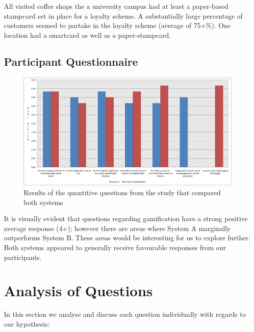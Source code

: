 All visited coffee shops the a university campus had at least a paper-based stampcard set in place for a loyalty scheme.  A substantially large percentage of customers seemed to partake in the loyalty scheme (average of 75+\%). One location had a smartcard as well as a paper-stampcard.


\subsection{Participant Questionnaire}
\begin{figure}[H]
 \centering
  \includegraphics[width=1\textwidth]{img/graph.png}
     \caption{Results of the quantitive questions from the study that compared both systems}
	 \label{participantGraph}
\end{figure}

It is visually evident that questions regarding gamification have a strong positive average response (4+); however there are areas where System A marginally outperforms System B. These areas would be interesting for us to explore further. Both systems appeared to generally receive favourable responses from our participants.
\newpage
\section{Analysis of Questions}
In this section we analyse and discuss each question individually with regards to our hypothesis:
